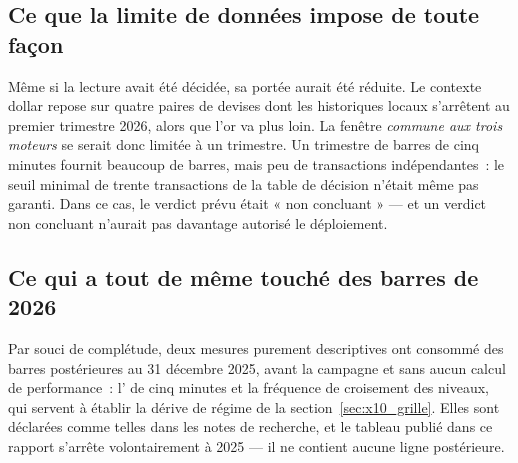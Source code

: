 \subsection{Ce que la limite de données impose de toute façon}

Même si la lecture avait été décidée, sa portée aurait été réduite. Le
contexte dollar repose sur quatre paires de devises dont les historiques
locaux s'arrêtent au premier trimestre 2026, alors que l'or va plus loin. La
fenêtre \emph{commune aux trois moteurs} se serait donc limitée à un
trimestre. Un trimestre de barres de cinq minutes fournit beaucoup de barres,
mais peu de transactions indépendantes~: le seuil minimal de trente
transactions de la table de décision n'était même pas garanti. Dans ce cas, le
verdict prévu était « non concluant » --- et un verdict non concluant n'aurait
pas davantage autorisé le déploiement.

\subsection{Ce qui a tout de même touché des barres de 2026}

Par souci de complétude, deux mesures purement descriptives ont consommé des
barres postérieures au 31 décembre 2025, avant la campagne et sans aucun
calcul de performance~: l' de cinq minutes et la fréquence de
croisement des niveaux, qui servent à établir la dérive de régime de la
section~\ref{sec:x10_grille}. Elles sont déclarées comme telles dans les
notes de recherche, et le tableau publié dans ce rapport s'arrête
volontairement à 2025 --- il ne contient aucune ligne postérieure.
